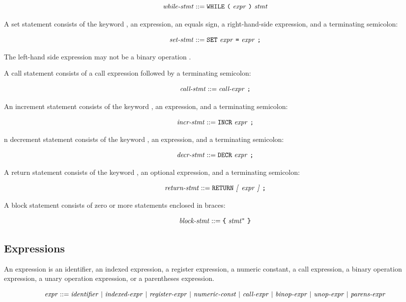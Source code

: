 \documentclass[10pt]{article}
\begin{document}
$$\mbox{\textit{while-stmt}} ::= \mbox{\texttt{WHILE} \texttt{(} \ensuremath{\mbox{\textit{expr}}}
  \texttt{)} \ensuremath{\mbox{\textit{stmt}}}}$$

 A set statement consists of the keyword
, an expression, an equals sign, a right-hand-side
expression, and a terminating semicolon:

$$\mbox{\textit{set-stmt}} ::= \mbox{\texttt{SET} \ensuremath{\mbox{\textit{expr}}} \texttt{=}
  \ensuremath{\mbox{\textit{expr}}} \texttt{;}}$$

\noindent
The left-hand side expression may not be a binary operation \kwd{=}.

 A call statement consists of a call
expression followed by a terminating semicolon:

$$\mbox{\textit{call-stmt}} ::= \mbox{\ensuremath{\mbox{\textit{call-expr}}} \texttt{;}}$$

 An increment statement consists of the
keyword , an expression, and a terminating semicolon:

$$\mbox{\textit{incr-stmt}} ::= \mbox{\texttt{INCR} \ensuremath{\mbox{\textit{expr}}} \texttt{;}}$$

 n decrement statement consists of the
keyword , an expression, and a terminating semicolon:

$$\mbox{\textit{decr-stmt}} ::= \mbox{\texttt{DECR} \ensuremath{\mbox{\textit{expr}}} \texttt{;}}$$

 A return statement consists of the keyword
, an optional expression, and a terminating semicolon:

$$\mbox{\textit{return-stmt}} ::= \mbox{\texttt{RETURN} \textit{[} \ensuremath{\mbox{\textit{expr}}} \textit{]}
    \texttt{;}}$$

 A block statement consists of zero or more
statements enclosed in braces:

$$\mbox{\textit{block-stmt}} ::= \mbox{\texttt{\{} \ensuremath{\mbox{\textit{stmt}}}$^*$
  \texttt{\}}}$$

\subsection{Expressions}
\label{sec:syntax:expressions}

An expression is an identifier, an indexed expression, a register
expression, a numeric constant, a call expression, a binary operation
expression, a unary operation expression, or a parentheses expression.

$$
%
\nonterm{expr} ::= \mbox{\nonterm{identifier} $|$
  \nonterm{indexed-expr} $|$ \nonterm{register-expr} $|$
  \nonterm{numeric-const} $|$ \nonterm{call-expr} $|$
  \nonterm{binop-expr} $|$ \nonterm{unop-expr} $|$
  \nonterm{parens-expr}}
%
$$
\end{document}
